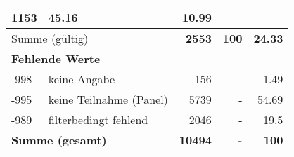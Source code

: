\begin{longtable}{lXrrr}
       \num{1153} &
       \num[round-mode=places,round-precision=2]{45.16} &
         \num[round-mode=places,round-precision=2]{10.99} \\
     \midrule
     \multicolumn{2}{l}{Summe (gültig)} &
       \textbf{\num{2553}} &
     \textbf{\num{100}} &
       \textbf{\num[round-mode=places,round-precision=2]{24.33}} \\
     \multicolumn{5}{l}{\textbf{Fehlende Werte}}\\
       -998 &
       keine Angabe &
         \num{156} &
        - &
         \num[round-mode=places,round-precision=2]{1.49} \\
       -995 &
       keine Teilnahme (Panel) &
         \num{5739} &
        - &
         \num[round-mode=places,round-precision=2]{54.69} \\
       -989 &
       filterbedingt fehlend &
         \num{2046} &
        - &
         \num[round-mode=places,round-precision=2]{19.5} \\
     \midrule
     \multicolumn{2}{l}{\textbf{Summe (gesamt)}} &
          \textbf{\num{10494}} &
        \textbf{-} &
        \textbf{\num{100}} \\
     \bottomrule
     \end{longtable}
     
